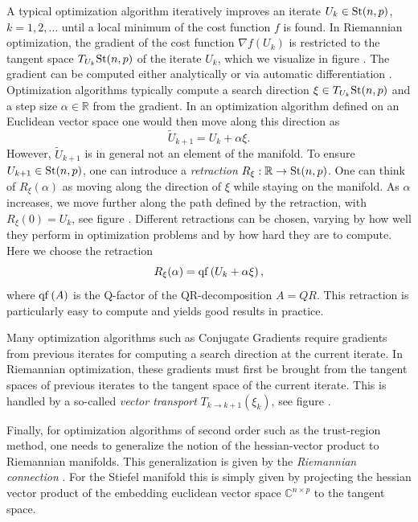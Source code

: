A typical optimization algorithm iteratively improves an iterate $U_k\in\text{St}(n,p)$, $k=1,2,\dots$ until a local minimum of the cost function $f$ is found. In Riemannian optimization, the gradient of the cost function $\nabla f\left(U_k\right)$ is restricted to the tangent space $T_{U_k}\text{St}(n,p)$ of the iterate $U_k$, which we visualize in figure . The gradient can be computed either analytically or via automatic differentiation \cite{cite:riemannian_geometry_automatic_differentiation_quantum_physics, cite:pymanopt}. Optimization algorithms typically compute a search direction $\xi\in T_{U_k}\text{St}(n,p)$ and a step size $\alpha \in \mathbb{R}$ from the gradient. In an optimization algorithm defined on an Euclidean vector space one would then move along this direction as
\begin{equation}
	\tilde{U}_{k+1} = U_k + \alpha\xi.
\end{equation}
However, $\tilde{U}_{k+1}$ is in general not an element of the manifold. To ensure $U_{k+1}\in\text{St}(n,p)$, one can introduce a \textit{retraction} $R_\xi:\mathbb{R}\to\text{St}(n,p)$. One can think of $R_\xi\left(\alpha\right)$ as moving along the direction of $\xi$ while staying on the manifold. As $\alpha$ increases, we move further along the path defined by the retraction, with $R_\xi(0) = U_k$, see figure . Different retractions can be chosen, varying by how well they perform in optimization problems and by how hard they are to compute. Here we choose the retraction
\begin{equation}
	R_\xi(\alpha) = \operatorname{qf}\left(U_k + \alpha\xi\right),
\end{equation}
where $\operatorname{qf}\left(A\right)$ is the Q-factor of the QR-decomposition $A = QR$. This retraction is particularly easy to compute and yields good results in practice. \par
Many optimization algorithms such as Conjugate Gradients require gradients from previous iterates for computing a search direction at the current iterate. In Riemannian optimization, these gradients must first be brought from the tangent spaces of previous iterates to the tangent space of the current iterate. This is handled by a so-called \textit{vector transport} $T_{k\rightarrow k+1}\left(\xi_k\right)$, see figure . \par
Finally, for optimization algorithms of second order such as the trust-region method, one needs to generalize the notion of the hessian-vector product to Riemannian manifolds. This generalization is given by the \textit{Riemannian connection} \cite{cite:optimization_on_matrix_manifolds}. For the Stiefel manifold this is simply given by projecting the hessian vector product of the embedding euclidean vector space $\mathbb{C}^{n\times p}$ to the tangent space. \par
